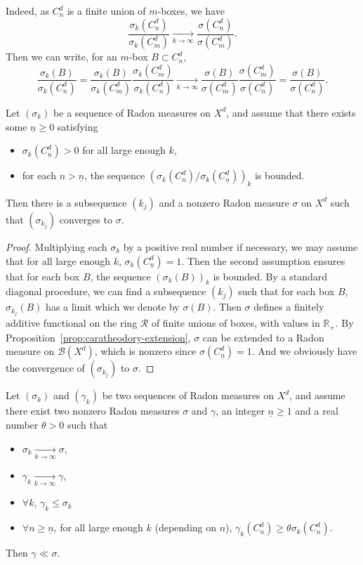 \documentclass[AHL,Unicode,longabstracts]{cedram}
\newcommand{\tend}[3][]{\xrightarrow[#2\to#3]{#1}}
\newcommand{\RR}{\mathbb{R}}
\newcommand{\B}{\mathscr{B}}
\newcommand{\cd}{C^{d}}
\let\oldforall\forall
\renewcommand*{\forall}{\mathrel{\oldforall}}
\begin{document}
Indeed, as $\cd_n$ is a finite union of $m$-boxes, we have
\[
\frac{\sigma_k(\cd_n)}{\sigma_k(\cd_m)} \tend{k}{\infty}
\frac{\sigma(\cd_n)}{\sigma(\cd_m)}.
\]
Then we can write, for an $m$-box $B\subset\cd_n$,
\[
\frac{\sigma_k(B)}{\sigma_k(\cd_n)} = \frac{\sigma_k(B)}{\sigma_k(\cd_m)}
\frac{\sigma_k(\cd_m)}{\sigma_k(\cd_n)}
\tend{k}{\infty} \frac{\sigma(B)}{\sigma(\cd_m)}
\frac{\sigma(\cd_m)}{\sigma(\cd_n)} = \frac{\sigma(B)}{\sigma(\cd_n)}.
\]

\begin{prop}\label{prop:compacity}
Let $(\sigma_k)$ be a sequence of Radon measures on $X^d$, and assume that there exists some $\underline{n}\ge 0$ satisfying
\begin{itemize}
\item $\sigma_k(\cd_{\underline{n}})>0$ for all large enough $k$,
\item for each $n>\underline{n}$, the sequence $\left(\sigma_k(\cd_n)/\sigma_k(\cd_{\underline{n}})\right)_{k}$ is bounded.
\end{itemize}
Then there is a subsequence $(k_j)$ and a nonzero Radon measure $\sigma$ on $X^d$ such that $(\sigma_{k_j})$ converges to $\sigma$.
\end{prop}
\begin{proof}
Multiplying each $\sigma_k$ by a positive real number if necessary, we may assume that for all large enough $k$, $\sigma_k(\cd_{\underline{n}})=1$. Then the second assumption ensures that for each box $B$, the sequence $\left(\sigma_k(B)\right)_k$ is bounded. By a standard diagonal procedure, we can find a subsequence $(k_j)$ such that for each box $B$, $\sigma_{k_j}(B)$ has a limit which we denote by $\sigma(B)$. Then $\sigma$ defines a finitely additive functional on the ring $\mathscr{R}$ of finite unions of boxes, with values in $\RR_+$. By Proposition~\ref{prop:caratheodory-extension}, $\sigma$ can be extended to a Radon measure on $\B(X^d)$, which is nonzero since $\sigma(\cd_{\underline{n}})=1$. And we obviously have the convergence of $(\sigma_{k_j})$ to $\sigma$.
\end{proof}


\begin{prop}\label{prop:absolute_continuity}
Let $(\sigma_k)$ and $(\gamma_k)$ be two sequences of Radon measures on $X^d$, and assume there exist two nonzero Radon measures $\sigma$ and $\gamma$, an integer $\underline{n}\ge1$ and a real number $\theta>0$ such that
\begin{itemize}
\item $\sigma_k\tend{k}{\infty}\sigma$,
\item $\gamma_k\tend{k}{\infty}\gamma$,
\item $\forall k$, $\gamma_k\le\sigma_k$
\item $\forall n\ge \underline{n}$, for all large enough $k$ (depending on $n$), $\gamma_k(\cd_n)\ge \theta \sigma_k(\cd_n)$.
\end{itemize}
Then $\gamma\ll\sigma$.
\end{prop}
\end{document}
